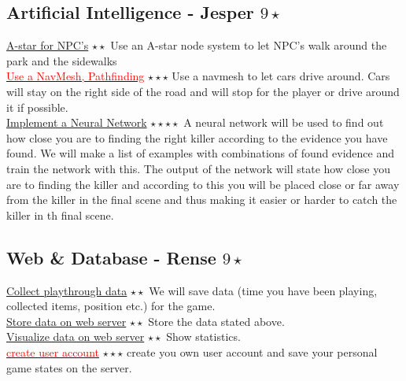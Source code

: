 \documentclass{article}
\begin{document}
		\subsection{Artificial Intelligence - Jesper $9 \star$}
			\underline{A-star for NPC's} $\star \star$ Use an A-star node system to let NPC's walk around the park and the sidewalks\\
			\underline \textcolor{red}{Use a NavMesh, Pathfinding} $\star \star \star$ Use a navmesh to let cars drive around. Cars will stay on the right side of the road and will stop for the player or drive around it if possible.\\
			\underline{Implement a Neural Network} $\star \star \star \star$ A neural network will be used to find out how close you are to finding the right killer according to the evidence you have found. We will make a list of examples with combinations of found evidence and train the network with this. The output of the network will state how close you are to finding the killer and according to this you will be placed close or far away from the killer in the final scene and thus making it easier or harder to catch the killer in th final scene.
		\subsection{Web \& Database - Rense $9 \star$}
			\underline{Collect playthrough data} $\star \star$ We will save data (time you have been playing, collected items, position etc.) for the game. \\
			\underline{Store data on web server} $\star \star$ Store the data stated above. \\
			\underline{Visualize data on web server} $\star \star$ Show statistics. \\
			\underline \textcolor{red}{create user account} $\star \star \star$ create you own user account and save your personal game states on the server. \\
			
\end{document}
